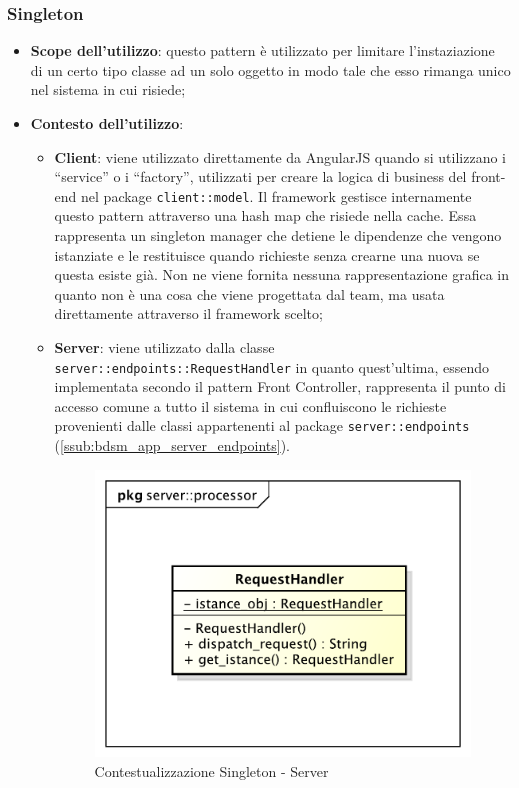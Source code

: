 	\subsubsection{Singleton} %
	\label{ssub:singleton}
		\begin{itemize}
			\item \textbf{Scope dell'utilizzo}: questo pattern è utilizzato per limitare l'instaziazione di un certo tipo classe ad un solo oggetto in modo tale che esso rimanga unico nel sistema in cui risiede;
			\item \textbf{Contesto dell'utilizzo}:
				\begin{itemize}
					\item \textbf{Client}: viene utilizzato direttamente da AngularJS quando si utilizzano i ``service'' o i ``factory'', utilizzati per creare la logica di business del front-end nel package \texttt{client::model}. Il framework gestisce internamente questo pattern attraverso una hash map che risiede nella cache. Essa rappresenta un singleton manager che detiene le dipendenze che vengono istanziate e le restituisce quando richieste senza crearne una nuova se questa esiste già. \newline
					Non ne viene fornita nessuna rappresentazione grafica in quanto non è una cosa che viene progettata dal team, ma usata direttamente attraverso il framework scelto;
					\item \textbf{Server}: viene utilizzato dalla classe \texttt{server::endpoints::RequestHandler} in quanto quest'ultima, essendo implementata secondo il pattern Front Controller, rappresenta il punto di accesso comune a tutto il sistema in cui confluiscono le richieste provenienti dalle classi appartenenti al package \texttt{server::endpoints} (\ref{ssub:bdsm_app_server_endpoints}). \newline
					\begin{figure}[!htbp]
						\centering
						\centerline{\includegraphics[scale=0.50]{./images/design_pattern_server/dp_singleton.pdf}}
						\caption{Contestualizzazione Singleton - Server}
					\end{figure}
				\end{itemize}
		\end{itemize}
